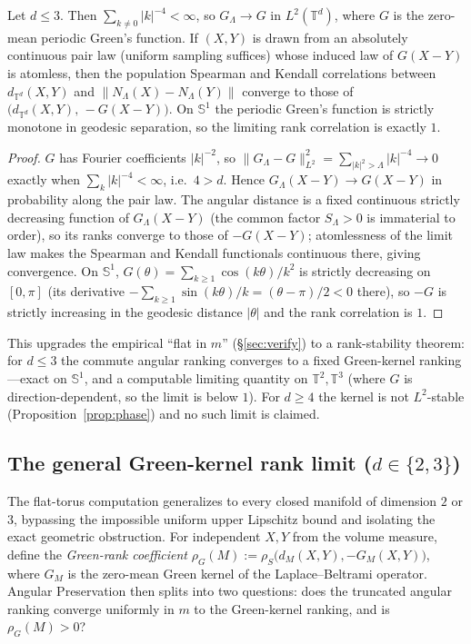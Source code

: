 \documentclass[review,supplement]{siamart220329}
\begin{document}
\begin{proposition}\label{prop:rank-torus}
Let $d\le3$. Then $\sum_{k\ne0}\lvert k\rvert^{-4}<\infty$, so $G_\Lambda\to G$ in
$L^2(\mathbb T^d)$, where $G$ is the zero-mean periodic Green's function. If $(X,Y)$ is
drawn from an absolutely continuous pair law (uniform sampling suffices) whose induced law of $G(X-Y)$ is atomless, then the population
Spearman and Kendall correlations between $d_{\mathbb T^d}(X,Y)$ and
$\lVert N_\Lambda(X)-N_\Lambda(Y)\rVert$ converge to those of
$\bigl(d_{\mathbb T^d}(X,Y),\,-G(X-Y)\bigr)$. On $\mathbb S^1$ the periodic Green's
function is strictly monotone in geodesic separation, so the limiting rank correlation
is exactly $1$.
\end{proposition}

\begin{proof}
$G$ has Fourier coefficients $\lvert k\rvert^{-2}$, so
$\lVert G_\Lambda-G\rVert^2_{L^2}=\sum_{\lvert k\rvert^2>\Lambda}\lvert k\rvert^{-4}\to0$
exactly when $\sum_k\lvert k\rvert^{-4}<\infty$, i.e.\ $4>d$. Hence $G_\Lambda(X-Y)\to
G(X-Y)$ in probability along the pair law. The angular distance is a fixed continuous
strictly decreasing function of $G_\Lambda(X-Y)$ (the common factor $S_\Lambda>0$ is
immaterial to order), so its ranks converge to those of $-G(X-Y)$; atomlessness of the
limit law makes the Spearman and Kendall functionals continuous there, giving
convergence. On $\mathbb S^1$, $G(\theta)=\sum_{k\ge1}\cos(k\theta)/k^2$ is strictly
decreasing on $[0,\pi]$ (its derivative $-\sum_{k\ge1}\sin(k\theta)/k=(\theta-\pi)/2<0$
there), so $-G$ is strictly increasing in the geodesic distance $\lvert\theta\rvert$
and the rank correlation is $1$.
\end{proof}

\noindent This upgrades the empirical ``flat in $m$'' (\S\ref{sec:verify}) to a
rank-stability theorem: for $d\le3$ the commute angular ranking converges to a fixed
Green-kernel ranking---exact on $\mathbb S^1$, and a computable limiting quantity on
$\mathbb T^2,\mathbb T^3$ (where $G$ is direction-dependent, so the limit is below $1$).
For $d\ge4$ the kernel is not $L^2$-stable (Proposition~\ref{prop:phase}) and no such
limit is claimed.


\subsection*{The general Green-kernel rank limit ($d\in\{2,3\}$)}
The flat-torus computation generalizes to every closed manifold of dimension $2$ or
$3$, bypassing the impossible uniform upper Lipschitz bound and isolating the exact
geometric obstruction. For independent $X,Y$ from the volume measure, define the
\emph{Green-rank coefficient} $\rho_G(M):=\rho_S\bigl(d_M(X,Y),-G_M(X,Y)\bigr)$, where
$G_M$ is the zero-mean Green kernel of the Laplace--Beltrami operator. Angular
Preservation then splits into two questions: does the truncated angular ranking
converge uniformly in $m$ to the Green-kernel ranking, and is $\rho_G(M)>0$?
\end{document}
